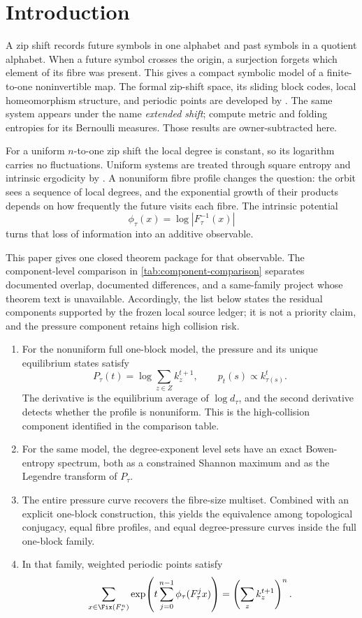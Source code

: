 \section{Introduction}

A zip shift records future symbols in one alphabet and past symbols in a
quotient alphabet.  When a future symbol crosses the origin, a surjection
forgets which element of its fibre was present.  This gives a compact
symbolic model of a finite-to-one noninvertible map.  The formal zip-shift
space, its sliding block codes, local homeomorphism structure, and periodic
points are developed by \citet{LameiMehdipour2025}.  The same system appears
under the name \emph{extended shift}; \citet{MartinsMattosVarao2026} compute
metric and folding entropies for its Bernoulli measures.  Those results are
owner-subtracted here.

For a uniform $n$-to-one zip shift the local degree is constant, so its
logarithm carries no fluctuations.  Uniform systems are treated through
square entropy and intrinsic ergodicity by
\citet{MehdipourJangjooye2025}.  A nonuniform fibre profile changes the
question: the orbit sees a sequence of local degrees, and the exponential
growth of their products depends on how frequently the future visits each
fibre.  The intrinsic potential
\[
 \phi_\tau(x)=\log |F_\tau^{-1}(x)|
\]
turns that loss of information into an additive observable.

This paper gives one closed theorem package for that observable.  The
component-level comparison in \cref{tab:component-comparison} separates
documented overlap, documented differences, and a same-family project whose
theorem text is unavailable.  Accordingly, the list below states the residual
components supported by the frozen local source ledger; it is not a priority
claim, and the pressure component retains high collision risk.
\begin{enumerate}
\item For the nonuniform full one-block model, the pressure and its unique
equilibrium states satisfy
\[
P_\tau(t)=\log\sum_{z\in Z}k_z^{t+1},\qquad
p_t(s)\propto k_{\tau(s)}^t.
\]
The derivative is the equilibrium average of $\log d_\tau$, and the second
derivative detects whether the profile is nonuniform.  This is the
high-collision component identified in the comparison table.
\item For the same model, the degree-exponent level sets have an exact
Bowen-entropy spectrum,
both as a constrained Shannon maximum and as the Legendre transform of
$P_\tau$.
\item The entire pressure curve recovers the fibre-size multiset.  Combined
with an explicit one-block construction, this yields the equivalence among
topological conjugacy, equal fibre profiles, and equal degree-pressure
curves inside the full one-block family.
\item In that family, weighted periodic points satisfy
\[
 \sum_{x\in\Fix(F_\tau^n)}
 \exp\!\left(t\sum_{j=0}^{n-1}\phi_\tau(F_\tau^j x)\right)
 =\left(\sum_z k_z^{t+1}\right)^n.
\]
\end{enumerate}

